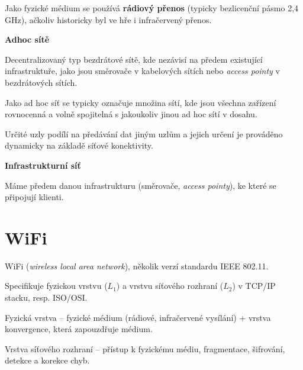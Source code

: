 \begin{compactitem}
    \item Jako fyzické médium se používá \textbf{rádiový přenos} (typicky bezlicenční pásmo 2,4\,GHz), ačkoliv historicky byl ve hře i infračervený přenos.

    \item \textbf{Adhoc sítě} \begin{compactitem}
        \item Decentralizovaný typ bezdrátové sítě, kde nezávisí na předem existující infrastruktuře, jako jsou směrovače v kabelových sítích nebo \textit{access pointy} v bezdrátových sítích.
        \item Jako ad hoc síť se typicky označuje množina sítí, kde jsou všechna zařízení rovnocenná a volně spojitelná s jakoukoliv jinou ad hoc sítí v dosahu.
        \item Určité uzly podílí na předávání dat jiným uzlům a jejich určení je prováděno dynamicky na základě síťové konektivity.
    \end{compactitem}

    \item \textbf{Infrastrukturní síť} \begin{compactitem}
        \item Máme předem danou infrastrukturu (směrovače, \textit{access pointy}), ke které se připojují klienti.
    \end{compactitem}
\end{compactitem}


\section{WiFi}

\begin{compactitem}
    \item WiFi (\textit{wireless local area network}), několik verzí standardu IEEE 802.11.

    \item Specifikuje fyzickou vrstvu ($L_1$) a vrstvu síťového rozhraní ($L_2$) v TCP/IP stacku, resp. ISO/OSI.

    \item Fyzická vrstva -- fyzické médium (rádiové, infračervené vysílání) + vrstva konvergence, která zapouzdřuje médium.

    \item Vrstva síťového rozhraní -- přístup k fyzickému médiu, fragmentace, šifrování, detekce a korekce chyb.
\end{compactitem}

